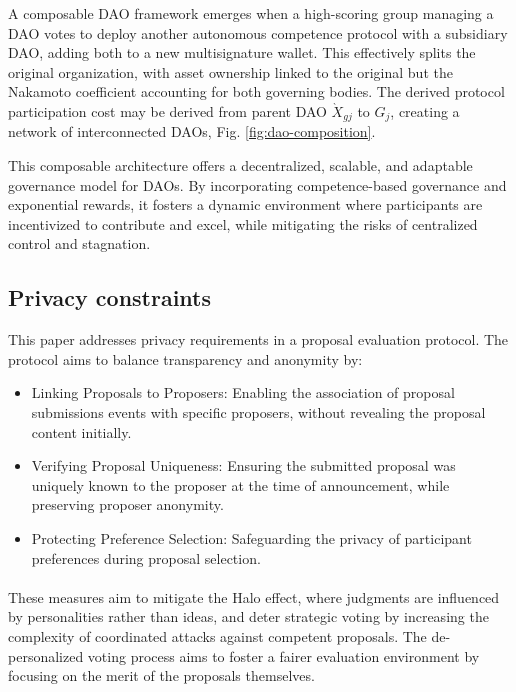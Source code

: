 \documentclass{article}
\begin{document}
\begin{CJK}{UTF8}{gbsn}
\begin{multicols}{2}
        A composable DAO framework emerges when a high-scoring group managing a DAO votes to deploy another autonomous competence protocol with a subsidiary DAO, adding both to a new multisignature wallet. This effectively splits the original organization, with asset ownership linked to the original but the Nakamoto coefficient accounting for both governing bodies. The derived protocol participation cost may be derived from parent DAO  $ \grave{X}_{gj}$ to $G_j$, creating a network of interconnected DAOs, Fig. \ref{fig:dao-composition}.

        

        This composable architecture offers a decentralized, scalable, and adaptable governance model for DAOs. By incorporating competence-based governance and exponential rewards, it fosters a dynamic environment where participants are incentivized to contribute and excel, while mitigating the risks of centralized control and stagnation.


        \subsection{Privacy constraints}

        This paper addresses privacy requirements in a proposal evaluation protocol. The protocol aims to balance transparency and anonymity by:
        \begin{itemize}
            \item Linking Proposals to Proposers: Enabling the association of proposal submissions events with specific proposers, without revealing the proposal content initially.
            \item Verifying Proposal Uniqueness: Ensuring the submitted proposal was uniquely known to the proposer at the time of announcement, while preserving proposer anonymity.
            \item Protecting Preference Selection: Safeguarding the privacy of participant preferences during proposal selection.

        \end{itemize}
        \paragraph{}

        These measures aim to mitigate the Halo effect, where judgments are influenced by personalities rather than ideas, and deter strategic voting by increasing the complexity of coordinated attacks against competent proposals. The de-personalized voting process aims to foster a fairer evaluation environment by focusing on the merit of the proposals themselves.


\end{multicols}
\end{CJK}
\end{document}
